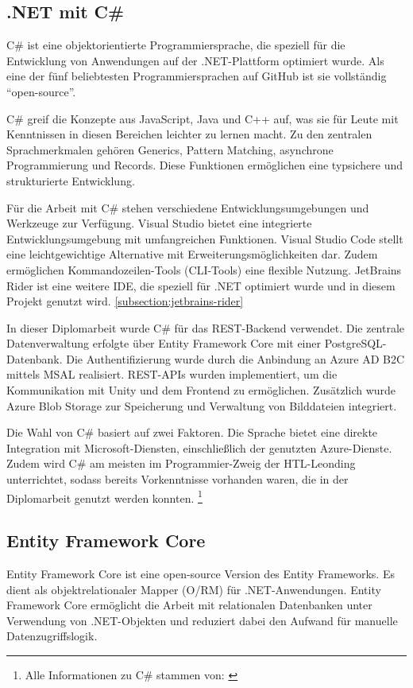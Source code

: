 \subsection{.NET mit C\#}

C\# ist eine objektorientierte Programmiersprache, die speziell für die Entwicklung von 
Anwendungen auf der .NET-Plattform optimiert wurde. Als eine der fünf beliebtesten 
Programmiersprachen auf GitHub ist sie vollständig ``open-source''.

C\# greif die Konzepte aus JavaScript, Java und C++ auf, was sie für Leute mit Kenntnissen
in diesen Bereichen leichter zu lernen macht. Zu den zentralen Sprachmerkmalen gehören Generics, 
Pattern Matching, asynchrone Programmierung und Records. Diese Funktionen ermöglichen eine 
typsichere und strukturierte Entwicklung.

Für die Arbeit mit C\# stehen verschiedene Entwicklungsumgebungen und Werkzeuge zur Verfügung. 
Visual Studio bietet eine integrierte Entwicklungsumgebung mit umfangreichen Funktionen. 
Visual Studio Code stellt eine leichtgewichtige Alternative mit Erweiterungsmöglichkeiten 
dar. Zudem ermöglichen Kommandozeilen-Tools (CLI-Tools) eine flexible Nutzung. JetBrains Rider 
ist eine weitere IDE, die speziell für .NET optimiert wurde und in diesem Projekt genutzt 
wird. \ref{subsection:jetbrains-rider}

In dieser Diplomarbeit wurde C\# für das REST-Backend verwendet. Die zentrale Datenverwaltung 
erfolgte über Entity Framework Core mit einer PostgreSQL-Datenbank. Die Authentifizierung 
wurde durch die Anbindung an Azure AD B2C mittels MSAL realisiert. REST-APIs wurden implementiert, 
um die Kommunikation mit Unity und dem Frontend zu ermöglichen. Zusätzlich wurde Azure Blob 
Storage zur Speicherung und Verwaltung von Bilddateien integriert.

Die Wahl von C\# basiert auf zwei Faktoren. Die Sprache bietet eine direkte Integration mit 
Microsoft-Diensten, einschließlich der genutzten Azure-Dienste. Zudem wird C\# am meisten im 
Programmier-Zweig der HTL-Leonding unterrichtet, sodass bereits Vorkenntnisse vorhanden 
waren, die in der Diplomarbeit genutzt werden konnten.
\footnote{Alle Informationen zu C\# stammen von: \cite{MicrosoftCorporationo}}

\subsection{Entity Framework Core}

Entity Framework Core ist eine open-source Version des Entity Frameworks. Es dient 
als objektrelationaler Mapper (O\slash RM) für .NET-Anwendungen. Entity Framework Core ermöglicht 
die Arbeit mit relationalen Datenbanken unter Verwendung von .NET-Objekten und reduziert 
dabei den Aufwand für manuelle Datenzugriffslogik.

